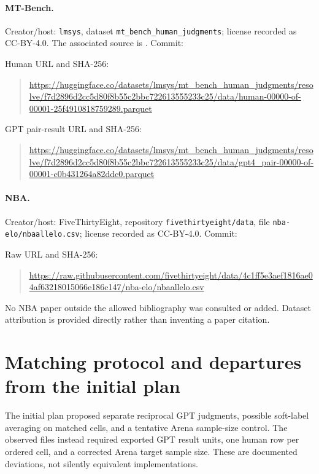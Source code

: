 \paragraph{MT-Bench.}
Creator/host: \texttt{lmsys}, dataset \texttt{mt\_bench\_human\_judgments}; license recorded as CC-BY-4.0. The associated source is \citet{zheng2023judging}. Commit:
\begin{quote}\small{}\end{quote}
Human URL and SHA-256:
\begin{quote}\small
\url{https://huggingface.co/datasets/lmsys/mt_bench_human_judgments/resolve/f7d2896d2cc5d80f8b55c2bbc722613555233c25/data/human-00000-of-00001-25f4910818759289.parquet}\\
\end{quote}
GPT pair-result URL and SHA-256:
\begin{quote}\small
\url{https://huggingface.co/datasets/lmsys/mt_bench_human_judgments/resolve/f7d2896d2cc5d80f8b55c2bbc722613555233c25/data/gpt4_pair-00000-of-00001-c0b431264a82ddc0.parquet}\\
\end{quote}

\paragraph{NBA.}
Creator/host: FiveThirtyEight, repository \texttt{fivethirtyeight/data}, file \texttt{nba-elo/nbaallelo.csv}; license recorded as CC-BY-4.0. Commit:
\begin{quote}\small{}\end{quote}
Raw URL and SHA-256:
\begin{quote}\small
\url{https://raw.githubusercontent.com/fivethirtyeight/data/4c1ff5e3aef1816ae04af63218015066e186c147/nba-elo/nbaallelo.csv}\\
\end{quote}
No NBA paper outside the allowed bibliography was consulted or added. Dataset attribution is provided directly rather than inventing a paper citation.

\section{Matching protocol and departures from the initial plan}
\label{app:matching}
The initial plan proposed separate reciprocal GPT judgments, possible soft-label averaging on matched cells, and a tentative Arena sample-size control. The observed files instead required exported GPT result units, one human row per ordered cell, and a corrected Arena target sample size. These are documented deviations, not silently equivalent implementations.

